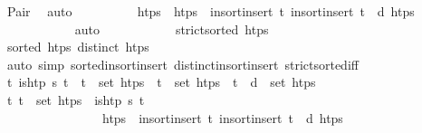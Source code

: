 \begin{isabellebody}
\ Pair\ \isamarkupfalse%
\ auto\isanewline
\ \ \ \ \ \ \ \ \isamarkupfalse%
\ htps\ \ {\isachardoublequoteopen}htps\ {\isacharequal}{\kern0pt}\ insort{\isacharunderscore}{\kern0pt}insert\ t\isactrlsub {\isasympi}\ {\isacharparenleft}{\kern0pt}insort{\isacharunderscore}{\kern0pt}insert\ {\isacharparenleft}{\kern0pt}t\isactrlsub {\isasympi}\ {\isacharplus}{\kern0pt}\ d{\isacharparenright}{\kern0pt}\ htps{\isacharprime}{\kern0pt}{\isacharparenright}{\kern0pt}{\isachardoublequoteclose}\isanewline
\ \ \ \ \ \ \ \ \ \ \isamarkupfalse%
\ auto\isanewline
\ \ \ \ \ \ \ \ \isamarkupfalse%
\ \isamarkupfalse%
\ {\isachardoublequoteopen}strict{\isacharunderscore}{\kern0pt}sorted\ htps{\isachardoublequoteclose}\isanewline
\ \ \ \ \ \ \ \ \ \ \isamarkupfalse%
\ {\isacartoucheopen}sorted\ htps{\isacharprime}{\kern0pt}{\isacartoucheclose}\ {\isacartoucheopen}distinct\ htps{\isacharprime}{\kern0pt}{\isacartoucheclose}\isanewline
\ \ \ \ \ \ \ \ \ \ \isamarkupfalse%
\ {\isacharparenleft}{\kern0pt}auto\ simp{\isacharcolon}{\kern0pt}\ sorted{\isacharunderscore}{\kern0pt}insort{\isacharunderscore}{\kern0pt}insert\ distinct{\isacharunderscore}{\kern0pt}insort{\isacharunderscore}{\kern0pt}insert\ strict{\isacharunderscore}{\kern0pt}sorted{\isacharunderscore}{\kern0pt}iff{\isacharparenright}{\kern0pt}\isanewline
\ \ \ \ \ \ \ \ \isamarkupfalse%
\ {\isachardoublequoteopen}{\isasymforall}t{\isachardot}{\kern0pt}\ is{\isacharunderscore}{\kern0pt}htp\ {\isasympi}s\ t\ {\isasymlongrightarrow}\ t\ {\isasymin}\ set\ htps{\isachardoublequoteclose}\ \ {\isachardoublequoteopen}t\isactrlsub {\isasympi}\ {\isasymin}\ set\ htps{\isachardoublequoteclose}\ \ {\isachardoublequoteopen}{\isacharparenleft}{\kern0pt}t\isactrlsub {\isasympi}\ {\isacharplus}{\kern0pt}\ d{\isacharparenright}{\kern0pt}\ {\isasymin}\ set\ htps{\isachardoublequoteclose}\isanewline
\ \ \ \ \ \ \ \ \ \ \isamarkupfalse%
\ {\isacartoucheopen}{\isasymforall}t{\isachardot}{\kern0pt}\ t\ {\isasymin}\ set\ htps{\isacharprime}{\kern0pt}\ {\isasymlongleftrightarrow}\ is{\isacharunderscore}{\kern0pt}htp\ {\isasympi}s\ t{\isacartoucheclose}\ \isanewline
\ \ \ \ \ \ \ \ \ \ \ \ \ \ \ \ {\isacartoucheopen}htps\ {\isacharequal}{\kern0pt}\ insort{\isacharunderscore}{\kern0pt}insert\ t\isactrlsub {\isasympi}\ {\isacharparenleft}{\kern0pt}insort{\isacharunderscore}{\kern0pt}insert\ {\isacharparenleft}{\kern0pt}t\isactrlsub {\isasympi}\ {\isacharplus}{\kern0pt}\ d{\isacharparenright}{\kern0pt}\ htps{\isacharprime}{\kern0pt}{\isacharparenright}{\kern0pt}{\isacartoucheclose}\ \isanewline

\end{isabellebody}
